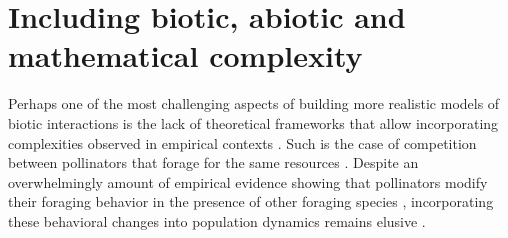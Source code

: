 \documentclass[12pt]{article}
\begin{document}
\section*{Including biotic, abiotic and mathematical complexity}
Perhaps one of the most challenging aspects of building more realistic models of biotic interactions is the lack of theoretical frameworks that allow incorporating complexities observed in empirical contexts \citep{abrams1983arguments}.  Such is the case of competition between pollinators that forage for the same resources \citep{thomson_importance_2020}. Despite an overwhelmingly amount of empirical evidence showing that pollinators modify their foraging behavior in the presence of other foraging species \citep{morse_resource_1977,inouye_resource_1978,thompson_dynamics_2006,brosi_single_2013,briggs_competitive_2016}, incorporating these behavioral changes into population dynamics remains elusive \citep{thomson_importance_2020}. 



\clearpage


\end{document}
